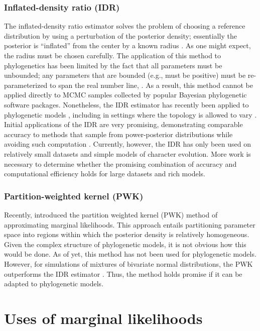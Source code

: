 \subsubsection{Inflated-density ratio (IDR)}
The inflated-density ratio estimator solves the problem of choosing a
reference distribution by using a perturbation of the posterior density;
essentially the posterior is ``inflated'' from the center by a known radius
\citep{Petris2007,Arima2012,Arima2014}.
As one might expect, the radius must be chosen carefully.
The application of this method to phylogenetics has been limited by the fact
that all parameters must be unbounded; any parameters that are bounded (e.g.,
must be positive) must be re-parameterized to span the real number line,
.
As a result, this method cannot be applied directly to MCMC samples collected
by popular Bayesian phylogenetic software packages.
Nonetheless, the IDR estimator has recently been applied to phylogenetic models
\citep{Arima2014}, including in settings where the topology is allowed to vary
\citep{Wu2014}.
Initial applications of the IDR are very promising, demonstrating comparable
accuracy to methods that sample from power-posterior distributions while
avoiding such computation \citep{Arima2014,Wu2014}.
Currently, however, the IDR has only been used on relatively small datasets and
simple models of character evolution.
More work is necessary to determine whether the promising combination of
accuracy and computational efficiency holds for large datasets and rich models.

\subsubsection{Partition-weighted kernel (PWK)}
Recently, \citet{Wang2017} introduced the partition weighted
kernel (PWK) method of approximating marginal likelihoods.
This approach entails partitioning parameter space into regions within which
the posterior density is relatively homogeneous.
Given the complex structure of phylogenetic models, it is not obvious how this
would be done.
As of yet, this method has not been used for phylogenetic models.
However, for simulations of mixtures of bivariate normal distributions, the
PWK outperforms the IDR estimator \citep{Wang2017}.
Thus, the method holds promise if it can be adapted to phylogenetic models.


\section{Uses of marginal likelihoods}

